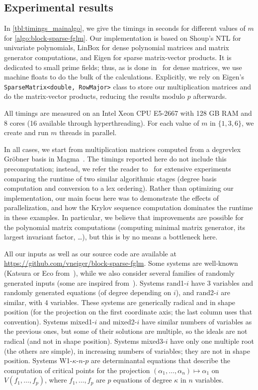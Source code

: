 \documentclass[final,1p,times,authoryear]{elsarticle}
\begin{document}

\subsection{Experimental results}\label{section:ex}

In \cref{tbl:timings_mainalgo}, we give the timings in seconds for
different values of $m$ for \cref{algo:block-sparse-fglm}.  Our
implementation is based on Shoup's NTL for univariate polynomials, LinBox
for dense polynomial matrices and matrix generator
computations, and Eigen for sparse matrix-vector
products. It is dedicated to small prime fields; thus,
as is done in~\citep{fflas-ffpack} for dense matrices, we use machine
floats to do the bulk of the calculations. Explicitly, we rely on
Eigen's {\tt SparseMatrix<double, RowMajor>} class to store our
multiplication matrices and do the matrix-vector products, reducing
the results modulo $p$ afterwards.

All timings are measured on an Intel Xeon CPU E5-2667 with 128 GB RAM
and 8 cores (16 available through hyperthreading). For each value of
$m$ in $\{1,3,6\}$, we create and run $m$ threads in parallel.

In all cases, we start from multiplication matrices computed from a
{degrevlex} Gr\"obner basis in Magma~\citep{BoCaPl97}. The timings
reported here do not include this precomputation; instead, we refer
the reader to~\citep{FaMo17} for extensive experiments comparing the
runtime of two similar algorithmic stages (degree basis computation and
conversion to a lex ordering).  Rather than optimizing our
implementation, our main focus here was to demonstrate the effects of
parallelization, and how the Krylov sequence computation dominates the
runtime in these examples. In particular, we believe that
improvements are possible for the polynomial matrix computations
(computing minimal matrix generator, its largest invariant factor,
\dots), but this is by no means a bottleneck here.

All our inputs as well as our source code are available at
\url{https://github.com/vneiger/block-sparse-fglm}.
Some systems
are well-known (Katsura or Eco from~\citep{Morgan88}), while we also
consider several families of randomly generated inputs (some are
inspired from~\citep{FaMo17}). Systems rand1-$i$ have $3$ variables and
randomly generated equations (of degree depending on $i$), and
rand2-$i$ are similar, with $4$ variables. These systems are
generically radical and in shape position (for the projection on the
first coordinate axis; the last column uses that
convention). Systems mixed1-$i$ and mixed2-$i$ have similar numbers of
variables as the previous ones, but some of their solutions are
multiple, so the ideals are not radical (and not in shape
position). Systems mixed3-$i$ have only one multiple root (the others
are simple), in increasing numbers of variables; they are not in shape
position. Systems W1-$\kappa$-$n$-$p$ are determinantal equations that
describe the computation of critical points for the projection $
(\alpha_1,\dots,\alpha_n) \mapsto \alpha_1$ on $V(f_1,\dots,f_p)$,
where $f_1,\dots,f_p$ are $p$ equations of degree $\kappa$ in $n$
variables.
\end{document}

